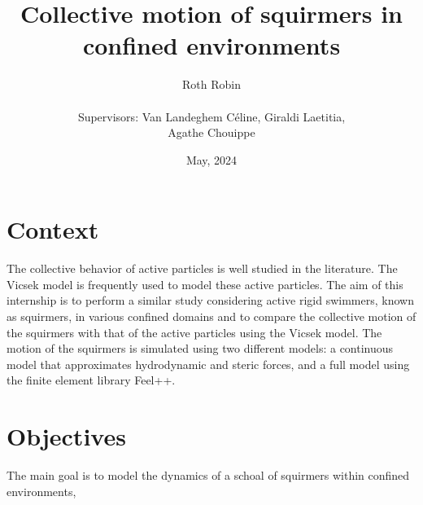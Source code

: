 \documentclass{article}
\begin{document}
\title{Collective motion of squirmers in confined environments}
\author{Roth Robin\\
\\
Supervisors: Van Landeghem Céline, Giraldi Laetitia,\\ Agathe Chouippe}
\date{May, 2024}
\maketitle

\tableofcontents

\section{Context}
The collective behavior of active particles is well studied in the literature. 
The Vicsek model is frequently used to model these active particles. 
The aim of this internship is to perform a similar study considering active rigid swimmers, known as squirmers, 
in various confined domains and to compare the collective motion of the squirmers with that of the active particles using the Vicsek model. 
The motion of the squirmers is simulated using two different models: a continuous model that approximates hydrodynamic and 
steric forces, and a full model using the finite element library Feel++.

\section{Objectives}
The main goal is to model the dynamics of a schoal of squirmers within confined environments, 
\end{document}
